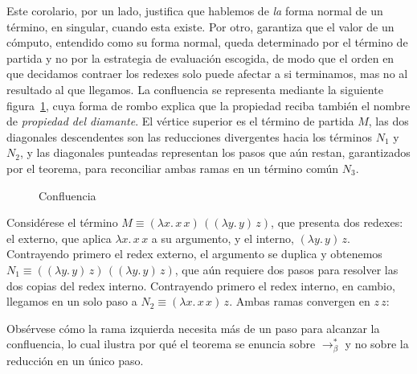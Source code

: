 Este corolario, por un lado, justifica que hablemos de \textit{la} forma normal de un término, en singular, cuando esta existe. Por otro, garantiza que el valor de un cómputo, entendido como su forma normal, queda determinado por el término de partida y no por la estrategia de evaluación escogida, de modo que el orden en que decidamos contraer los redexes solo puede afectar a si terminamos, mas no al resultado al que llegamos.
\newline
\newline
La confluencia se representa mediante la siguiente figura~\ref{fig:diagrama}, cuya forma de rombo explica que la propiedad reciba también el nombre de \textit{propiedad del diamante}. El vértice superior es el término de partida $M$, las dos diagonales descendentes son las reducciones divergentes hacia los términos $N_1$ y $N_2$, y las diagonales punteadas representan los pasos que aún restan, garantizados por el teorema, para reconciliar ambas ramas en un término común $N_3$.

\begin{figure}
  \centering
{}
\caption{Confluencia}
\label{fig:diagrama}
\end{figure}

\begin{example}
  Considérese el término $M \equiv (\lambda x.\, x\,x)\,((\lambda y.\, y)\, z)$, que presenta
  dos redexes: el externo, que aplica $\lambda x.\, x\,x$ a su argumento, y el interno,
  $(\lambda y.\, y)\, z$. Contrayendo primero el redex externo, el argumento se duplica y
  obtenemos $N_1 \equiv ((\lambda y.\, y)\, z)\,((\lambda y.\, y)\, z)$, que aún requiere dos
  pasos para resolver las dos copias del redex interno. Contrayendo primero el redex interno,
  en cambio, llegamos en un solo paso a $N_2 \equiv (\lambda x.\, x\,x)\, z$. Ambas ramas
  convergen en $z\,z$:


  Obsérvese cómo la rama izquierda necesita más de un paso para alcanzar la confluencia, lo
  cual ilustra por qué el teorema se enuncia sobre $\to_\beta^{\ast}$ y no sobre la reducción
  en un único paso.
\end{example}

